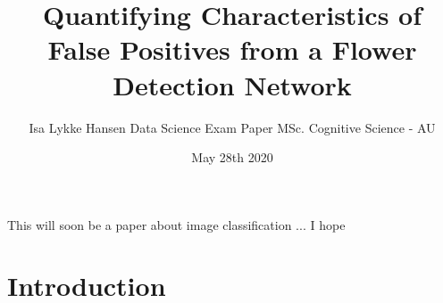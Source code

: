\documentclass[12pt]{article}
\title{Quantifying Characteristics of False Positives from a Flower Detection Network}
\author{\parbox{\linewidth}{\centering%
Isa Lykke Hansen\endgraf\bigskip
Data Science Exam Paper \endgraf
MSc. Cognitive Science - AU}}
\date{May 28th 2020}
\begin{document}
\onehalfspacing

\begin{titlepage}
	\maketitle
	\newpage
\end{titlepage}


\abstract{}
This will soon be a paper about image classification ... I hope

\section{Introduction}



















\clearpage
\appto{\bibsetup}{\raggedright}
\printbibliography
\end{document}
